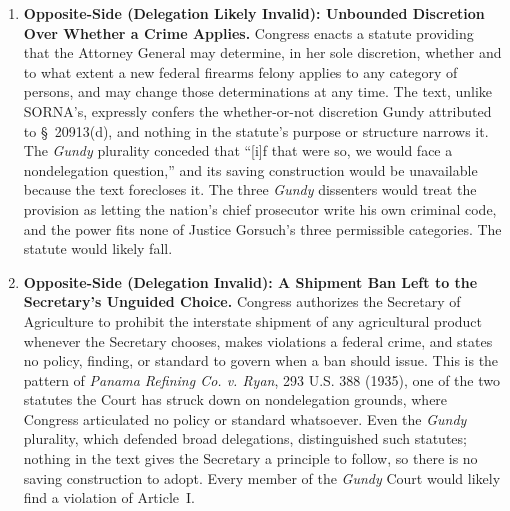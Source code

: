 \documentclass[12pt]{article}
\begin{document}
\begin{enumerate}
\item \textbf{Opposite-Side (Delegation Likely Invalid): Unbounded Discretion Over Whether a Crime Applies.} Congress enacts a statute providing that the Attorney General may determine, in her sole discretion, whether and to what extent a new federal firearms felony applies to any category of persons, and may change those determinations at any time. The text, unlike SORNA's, expressly confers the whether-or-not discretion Gundy attributed to \S~20913(d), and nothing in the statute's purpose or structure narrows it. The \textit{Gundy} plurality conceded that ``[i]f that were so, we would face a nondelegation question,'' and its saving construction would be unavailable because the text forecloses it. The three \textit{Gundy} dissenters would treat the provision as letting the nation's chief prosecutor write his own criminal code, and the power fits none of Justice Gorsuch's three permissible categories. The statute would likely fall.

\item \textbf{Opposite-Side (Delegation Invalid): A Shipment Ban Left to the Secretary's Unguided Choice.} Congress authorizes the Secretary of Agriculture to prohibit the interstate shipment of any agricultural product whenever the Secretary chooses, makes violations a federal crime, and states no policy, finding, or standard to govern when a ban should issue. This is the pattern of \textit{Panama Refining Co. v. Ryan}, 293 U.S. 388 (1935), one of the two statutes the Court has struck down on nondelegation grounds, where Congress articulated no policy or standard whatsoever. Even the \textit{Gundy} plurality, which defended broad delegations, distinguished such statutes; nothing in the text gives the Secretary a principle to follow, so there is no saving construction to adopt. Every member of the \textit{Gundy} Court would likely find a violation of Article~I.


\end{enumerate}
\end{document}
